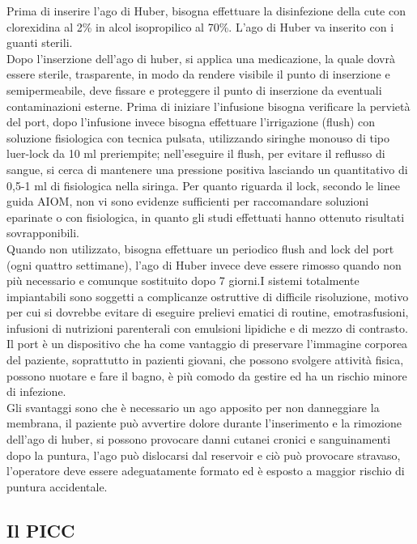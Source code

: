Prima di inserire l’ago di Huber, bisogna effettuare la disinfezione 
della cute con clorexidina al 2\% in alcol isopropilico al 70\%. L’ago di Huber va inserito con i guanti sterili\cite{GAVECELTracc2021}.\\
Dopo l’inserzione dell’ago di huber, si applica una medicazione, la quale dovrà essere sterile, trasparente, 
in modo da rendere visibile il punto di inserzione e semipermeabile, deve fissare e proteggere il punto di inserzione 
da eventuali contaminazioni esterne. Prima di iniziare l’infusione bisogna verificare la pervietà del port, 
dopo l’infusione invece bisogna effettuare l’irrigazione (flush) con soluzione fisiologica con tecnica pulsata, 
utilizzando siringhe monouso di tipo luer-lock da 10 ml preriempite; nell’eseguire il flush, per evitare il reflusso 
di sangue, si cerca di mantenere una pressione positiva lasciando un quantitativo di 0,5-1 ml di fisiologica nella 
siringa. Per quanto riguarda il lock, secondo le linee guida AIOM, non vi sono evidenze sufficienti per raccomandare 
soluzioni eparinate o con fisiologica, in quanto gli studi effettuati hanno ottenuto risultati sovrapponibili\cite{AIOMCVC}.\\
Quando non utilizzato, bisogna effettuare un periodico flush and lock del port (ogni quattro settimane), l’ago di Huber
invece deve essere rimosso quando non più necessario e comunque sostituito dopo 7 giorni.I sistemi totalmente 
impiantabili sono soggetti a complicanze ostruttive di difficile risoluzione, motivo per cui si dovrebbe evitare di 
eseguire prelievi ematici di routine, emotrasfusioni, infusioni di nutrizioni parenterali con emulsioni lipidiche e 
di mezzo di contrasto\cite{GAVECELTracc2021}.\\
Il port è un dispositivo che ha come vantaggio di preservare l’immagine corporea del paziente, soprattutto in pazienti 
giovani, che possono svolgere attività fisica, possono nuotare e fare il bagno, è più comodo da gestire ed ha un 
rischio minore di infezione.\\ 
Gli svantaggi sono che è necessario un ago apposito per non danneggiare la membrana, il paziente può avvertire dolore 
durante l’inserimento e la rimozione dell’ago di huber, si possono provocare danni cutanei cronici e sanguinamenti 
dopo la puntura, l’ago può dislocarsi dal reservoir e ciò può provocare stravaso, l’operatore deve essere 
adeguatamente formato ed è esposto a maggior rischio di puntura accidentale.\\ %

\subsection{Il PICC}


